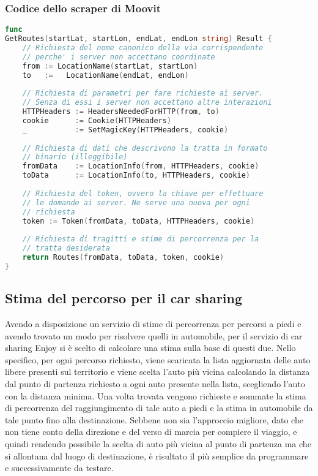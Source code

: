 \subsubsection{Codice dello scraper di Moovit}

\begin{lstlisting}[language=Go]
func
GetRoutes(startLat, startLon, endLat, endLon string) Result {
	// Richiesta del nome canonico della via corrispondente
	// perche' i server non accettano coordinate
	from := LocationName(startLat, startLon)
	to   :=   LocationName(endLat, endLon)
	
	// Richiesta di parametri per fare richieste ai server.
	// Senza di essi i server non accettano altre interazioni
	HTTPHeaders := HeadersNeededForHTTP(from, to)
	cookie      := Cookie(HTTPHeaders)
	_           := SetMagicKey(HTTPHeaders, cookie)
	
	// Richiesta di dati che descrivono la tratta in formato
	// binario (illeggibile)
	fromData    := LocationInfo(from, HTTPHeaders, cookie)
	toData      := LocationInfo(to, HTTPHeaders, cookie)
	
	// Richiesta del token, ovvero la chiave per effettuare
	// le domande ai server. Ne serve una nuova per ogni
	// richiesta
	token := Token(fromData, toData, HTTPHeaders, cookie)
	
	// Richiesta di tragitti e stime di percorrenza per la
	// tratta desiderata
	return Routes(fromData, toData, token, cookie)
}
\end{lstlisting}

\subsection{Stima del percorso per il car sharing}

Avendo a disposizione un servizio di stime di percorrenza per percorsi a piedi e avendo trovato un modo per risolvere quelli in automobile, per il servizio di car sharing Enjoy si è scelto di calcolare una stima sulla base di questi due. Nello specifico, per ogni percorso richiesto, viene scaricata la lista aggiornata delle auto libere presenti sul territorio e viene scelta l'auto più vicina calcolando la distanza dal punto di partenza richiesto a ogni auto presente nella lista, scegliendo l'auto con la distanza minima. Una volta trovata vengono richieste e sommate la stima di percorrenza del raggiungimento di tale auto a piedi e la stima in automobile da tale punto fino alla destinazione. Sebbene non sia l'approccio migliore, dato che non tiene conto della direzione e del verso di marcia per compiere il viaggio, e quindi rendendo possibile la scelta di auto più vicina al punto di partenza ma che si allontana dal luogo di destinazione, è risultato il più semplice da programmare e successivamente da testare.

